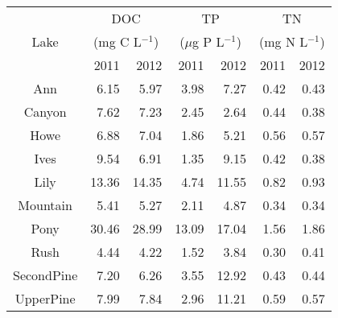 \begin{table}[ht]
\centering
\begin{tabular}{crrrrrr}
  \hline
\hline
   & \multicolumn{2}{c}{DOC} & 
                      \multicolumn{2}{c}{TP} & 
                      \multicolumn{2}{c}{TN}\\
 Lake & \multicolumn{2}{c}{(mg C L$^{-1}$)} & 
                      \multicolumn{2}{c}{($\mu$g P L$^{-1}$)} & 
                      \multicolumn{2}{c}{(mg N L$^{-1}$)}\\
  & 2011 & 2012 & 2011 & 2012 & 2011 & 2012 \\
 \hline
Ann & 6.15 & 5.97 & 3.98 & 7.27 & 0.42 & 0.43 \\ 
  Canyon & 7.62 & 7.23 & 2.45 & 2.64 & 0.44 & 0.38 \\ 
  Howe & 6.88 & 7.04 & 1.86 & 5.21 & 0.56 & 0.57 \\ 
  Ives & 9.54 & 6.91 & 1.35 & 9.15 & 0.42 & 0.38 \\ 
  Lily & 13.36 & 14.35 & 4.74 & 11.55 & 0.82 & 0.93 \\ 
  Mountain & 5.41 & 5.27 & 2.11 & 4.87 & 0.34 & 0.34 \\ 
  Pony & 30.46 & 28.99 & 13.09 & 17.04 & 1.56 & 1.86 \\ 
  Rush & 4.44 & 4.22 & 1.52 & 3.84 & 0.30 & 0.41 \\ 
  SecondPine & 7.20 & 6.26 & 3.55 & 12.92 & 0.43 & 0.44 \\ 
  UpperPine & 7.99 & 7.84 & 2.96 & 11.21 & 0.59 & 0.57 \\ 
   \hline
\end{tabular}
\end{table}
